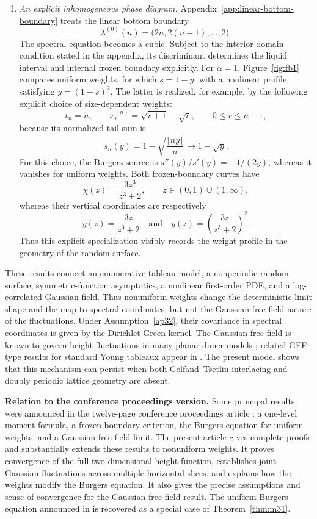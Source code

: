 \documentclass[11pt]{amsart}
\newenvironment{introrevision}{\begingroup\color{black}}{\endgroup}
\theoremstyle{plain}
\numberwithin{equation}{section}
\numberwithin{theorem}{section}
\numberwithin{figure}{section}
\begin{document}
\begin{introrevision}
\begin{enumerate}[label=\textup{(\roman*)},leftmargin=*]
\item
\emph{An explicit inhomogeneous phase diagram.}
Appendix~\ref{app:linear-bottom-boundary} treats the linear bottom
boundary
\[
    \lambda^{(0)}(n)
    =
    \bigl(2n,2(n-1),\ldots,2\bigr).
\]
The spectral equation becomes a cubic. Subject to the interior-domain
condition stated in the appendix, its discriminant determines the
liquid interval and internal frozen boundary explicitly. For $\alpha=1$,
Figure~\ref{fig:fb1} compares uniform weights, for which $s=1-y$,
with a nonlinear profile satisfying $y=(1-s)^2$. The latter is
realized, for example, by the following explicit choice of
size-dependent weights:
\[
    t_n=n,
    \qquad
    x_r^{(n)}=\sqrt{r+1}-\sqrt r,
    \qquad 0\leq r\leq n-1,
\]
because its normalized tail sum is
\[
    s_n(y)
    =1-\sqrt{\frac{\lfloor ny\rfloor}{n}}
    \longrightarrow 1-\sqrt y.
\]
For this choice, the Burgers source is
$s''(y)/s'(y)=-1/(2y)$, whereas it vanishes for uniform weights.
Both frozen-boundary curves have
\[
    \chi(z)=\frac{3z^3}{z^3+2},
    \qquad z\in(0,1)\cup(1,\infty),
\]
whereas their vertical coordinates are respectively
\[
    y(z)=\frac{3z}{z^3+2}
    \quad\text{and}\quad
    y(z)=\left(\frac{3z}{z^3+2}\right)^2.
\]
Thus this explicit specialization visibly records the weight
profile in the geometry of the random surface.

\end{enumerate}

These results connect an enumerative tableau model, a nonperiodic
random surface, symmetric-function asymptotics, a nonlinear
first-order PDE, and a log-correlated Gaussian field. Thus nonuniform weights change the deterministic limit shape and the
map to spectral coordinates, but not the Gaussian-free-field nature of
the fluctuations. Under Assumption~\ref{ap32}, their covariance in
spectral coordinates is given by the Dirichlet Green kernel. The Gaussian free field
is known to govern height fluctuations in many planar dimer models
\cite{RK01,Li13}; related GFF-type results for standard Young tableaux
appear in \cite{raposo}. The present model shows that this mechanism
can persist when both Gelfand--Tsetlin interlacing and doubly periodic
lattice geometry are absent.
\end{introrevision}
\medskip

\noindent\textbf{Relation to the conference proceedings version.}
Some principal results were announced in the twelve-page conference
proceedings article \cite{LKP24}: a one-level moment formula, a
frozen-boundary criterion, the Burgers equation for uniform weights,
and a Gaussian free field limit. The present article gives complete
proofs and substantially extends these results to nonuniform weights.
It proves convergence of the full two-dimensional height function,
establishes joint Gaussian fluctuations across multiple horizontal
slices, and explains how the weights modify the Burgers equation. It
also gives the precise assumptions and sense of convergence for the
Gaussian free field result. The uniform Burgers equation announced in
\cite{LKP24} is recovered as a special case of
Theorem~\ref{thm:m31}.
\end{document}
